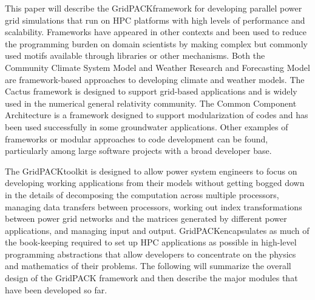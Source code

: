 \documentclass[preprint]{acm_proc_article-sp}
\begin{document}
This paper will describe the GridPACK\texttrademark framework for developing parallel
power grid simulations that run on HPC platforms with high levels of
performance and scalability. Frameworks have appeared in other contexts and been
used to reduce the programming burden on domain scientists by making complex
but commonly used motifs available through libraries or other mechanisms.
Both the Community Climate System Model\cite{CCSM} and Weather Research
and Forecasting Model\cite{WRF} are framework-based
approaches to developing climate and weather models. The Cactus framework is
designed to support grid-based applications and is widely used in the numerical
general relativity community\cite{CACTUS}. The Common Component
Architecture\cite{CCA} is a framework
designed to support modularization of codes and has been used successfully in
some groundwater applications\cite{SPH}. Other examples of frameworks or modular approaches
to code development can be found, particularly among large software projects
with a broad developer base.

The GridPACK\texttrademark toolkit is designed to allow power
system engineers to focus on developing working applications from their
models without getting bogged down in the details of decomposing the computation
across multiple processors, managing data transfers between processors, working out
index transformations between power grid networks and the matrices generated by
different power applications, and managing input and output.
GridPACK\texttrademark encapsulates as much of the book-keeping required to set up HPC
applications as possible in high-level programming abstractions that allow developers
to concentrate on the physics and mathematics of their problems.
The following will summarize the overall design of the GridPACK\texttrademark
framework and then
describe the major modules that have been developed so far.

\newpage
\end{document}
